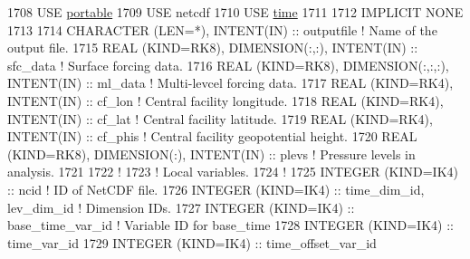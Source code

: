 \begin{DoxyCode}
1708     \textcolor{keywordtype}{USE }\hyperlink{namespaceportable}{portable}
1709     \textcolor{keywordtype}{USE }netcdf
1710     \textcolor{keywordtype}{USE }\hyperlink{namespacetime}{time}
1711 
1712     \textcolor{keywordtype}{IMPLICIT NONE}
1713 
1714     \textcolor{keywordtype}{CHARACTER (LEN=*)}, \textcolor{keywordtype}{INTENT(IN)}                                       :: outputfile       \textcolor{comment}{! Name of the
       output file.}
1715     \textcolor{keywordtype}{REAL (KIND=RK8)}, \textcolor{keywordtype}{DIMENSION(:,:)}, \textcolor{keywordtype}{INTENT(IN)}                         :: sfc\_data         \textcolor{comment}{! Surface
       forcing data.}
1716     \textcolor{keywordtype}{REAL (KIND=RK8)}, \textcolor{keywordtype}{DIMENSION(:,:,:)}, \textcolor{keywordtype}{INTENT(IN)}                       :: ml\_data          \textcolor{comment}{! Multi-levcel
       forcing data.}
1717     \textcolor{keywordtype}{REAL (KIND=RK4)}, \textcolor{keywordtype}{INTENT(IN)}                                         :: cf\_lon           \textcolor{comment}{! Central
       facility longitude.}
1718     \textcolor{keywordtype}{REAL (KIND=RK4)}, \textcolor{keywordtype}{INTENT(IN)}                                         :: cf\_lat           \textcolor{comment}{! Central
       facility latitude.}
1719     \textcolor{keywordtype}{REAL (KIND=RK4)}, \textcolor{keywordtype}{INTENT(IN)}                                         :: cf\_phis          \textcolor{comment}{! Central
       facility geopotential height.}
1720     \textcolor{keywordtype}{REAL (KIND=RK8)}, \textcolor{keywordtype}{DIMENSION(:)}, \textcolor{keywordtype}{INTENT(IN)}                           :: plevs            \textcolor{comment}{! Pressure
       levels in analysis.}
1721 
1722     \textcolor{comment}{!}
1723     \textcolor{comment}{! Local variables.}
1724     \textcolor{comment}{!}
1725     \textcolor{keywordtype}{INTEGER (KIND=IK4)}                  :: ncid                                                 \textcolor{comment}{! ID of
       NetCDF file.}
1726     \textcolor{keywordtype}{INTEGER (KIND=IK4)}                  :: time\_dim\_id, lev\_dim\_id                              \textcolor{comment}{! Dimension
       IDs.}
1727     \textcolor{keywordtype}{INTEGER (KIND=IK4)}                  :: base\_time\_var\_id                                     \textcolor{comment}{! Variable
       ID for base\_time}
1728     \textcolor{keywordtype}{INTEGER (KIND=IK4)}                  :: time\_var\_id
1729     \textcolor{keywordtype}{INTEGER (KIND=IK4)}                  :: time\_offset\_var\_id

\end{DoxyCode}
